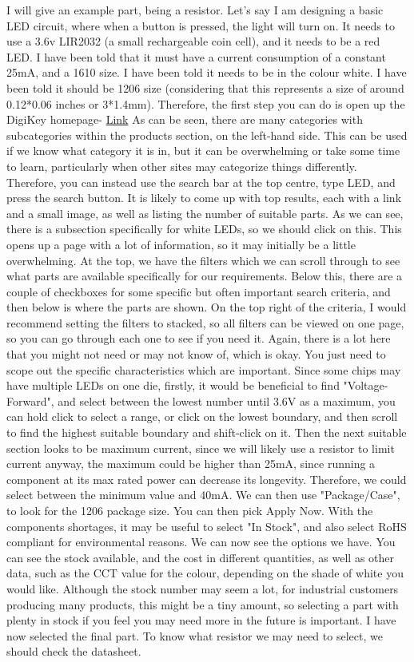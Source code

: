 \documentclass[a4paper,11pt]{report}
\begin{document}
I will give an example part, being a resistor. Let's say I am designing a basic LED circuit, where when a button is pressed, the light will turn on. It needs to use a 3.6v LIR2032 (a small rechargeable coin cell), and it needs to be a red LED. I have been told that it must have a current consumption of a constant 25mA, and a 1610 size. I have been told it needs to be in the colour white. I have been told it should be 1206 size (considering that this represents a size of around 0.12*0.06 inches or 3*1.4mm).
Therefore, the first step you can do is open up the DigiKey homepage- \href{https://www.DigiKey.co.uk/}{Link}
As can be seen, there are many categories with subcategories within the products section, on the left-hand side. This can be used if we know what category it is in, but it can be overwhelming or take some time to learn, particularly when other sites may categorize things differently. Therefore, you can instead use the search bar at the top centre, type LED, and press the search button. It is likely to come up with top results, each with a link and a small image, as well as listing the number of suitable parts. As we can see, there is a subsection specifically for white LEDs, so we should click on this. This opens up a page with a lot of information, so it may initially be a little overwhelming. At the top, we have the filters which we can scroll through to see what parts are available specifically for our requirements. Below this, there are a couple of checkboxes for some specific but often important search criteria, and then below is where the parts are shown. On the top right of the criteria, I would recommend setting the filters to stacked, so all filters can be viewed on one page, so you can go through each one to see if you need it. Again, there is a lot here that you might not need or may not know of, which is okay. You just need to scope out the specific characteristics which are important. Since some chips may have multiple LEDs on one die, firstly, it would be beneficial to find "Voltage- Forward", and select between the lowest number until 3.6V as a maximum, you can hold click to select a range, or click on the lowest boundary, and then scroll to find the highest suitable boundary and shift-click on it. Then the next suitable section looks to be maximum current, since we will likely use a resistor to limit current anyway, the maximum could be higher than 25mA, since running a component at its max rated power can decrease its longevity. Therefore, we could select between the minimum value and 40mA. We can then use "Package/Case", to look for the 1206 package size. You can then pick Apply Now. With the components shortages, it may be useful to select "In Stock", and also select RoHS compliant for environmental reasons. We can now see the options we have. You can see the stock available, and the cost in different quantities, as well as other data, such as the CCT value for the colour, depending on the shade of white you would like. Although the stock number may seem a lot, for industrial customers producing many products, this might be a tiny amount, so selecting a part with plenty in stock if you feel you may need more in the future is important. I have now selected the final part. To know what resistor we may need to select, we should check the datasheet. 
\end{document}
